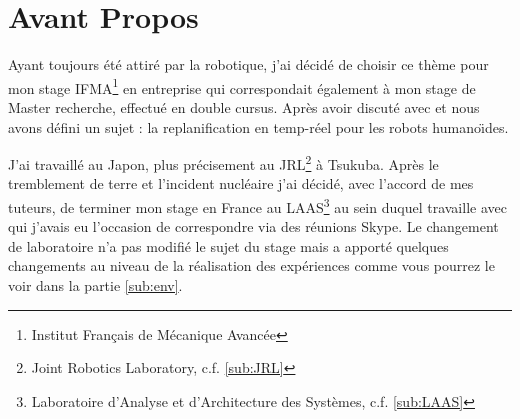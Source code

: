 \section*{Avant Propos}

Ayant toujours été attiré par la robotique, j'ai décidé de choisir ce thème pour mon stage IFMA\footnote{Institut Français de Mécanique Avancée} en entreprise qui correspondait également à mon stage de Master recherche, effectué en double cursus.
Après avoir discuté avec \olivier{} et \eiichi nous avons défini un sujet : la replanification en temp-réel pour les robots humano\"\i des.

J'ai travaillé au Japon, plus précisement au JRL\footnote{Joint Robotics Laboratory, c.f. \ref{sub:JRL}} à Tsukuba. Après le tremblement de terre et l'incident nucléaire j'ai décidé, avec l'accord de mes tuteurs, de terminer mon stage en France au LAAS\footnote{Laboratoire d'Analyse et d'Architecture des Systèmes, c.f. \ref{sub:LAAS}} au sein duquel travaille \florent avec qui j'avais eu l'occasion de correspondre via des réunions Skype.
Le changement de laboratoire n'a pas modifié le sujet du stage mais a apporté quelques changements au niveau de la réalisation des expériences comme vous pourrez le voir dans la partie \ref{sub:env}.
